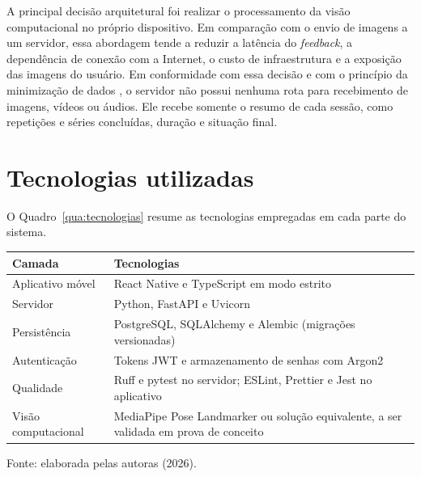 A principal decisão arquitetural foi realizar o processamento da visão computacional no próprio dispositivo. Em comparação com o envio de imagens a um servidor, essa abordagem tende a reduzir a latência do \textit{feedback}, a dependência de conexão com a Internet, o custo de infraestrutura e a exposição das imagens do usuário. Em conformidade com essa decisão e com o princípio da minimização de dados \cite{LGPD2018}, o servidor não possui nenhuma rota para recebimento de imagens, vídeos ou áudios. Ele recebe somente o resumo de cada sessão, como repetições e séries concluídas, duração e situação final.

\section{Tecnologias utilizadas}
\label{sec:tecnologias}

O Quadro~\ref{qua:tecnologias} resume as tecnologias empregadas em cada parte do sistema.

\begin{quadro}[htbp]
    \centering
    \caption{Tecnologias utilizadas no FisioMove}
    \label{qua:tecnologias}
    \begin{tabular}{|p{4cm}|p{10cm}|}
        \hline
        \textbf{Camada} & \textbf{Tecnologias} \\ \hline
        Aplicativo móvel & React Native e TypeScript em modo estrito \cite{ReactNative} \\ \hline
        Servidor & Python, FastAPI e Uvicorn \cite{FastAPI} \\ \hline
        Persistência & PostgreSQL, SQLAlchemy e Alembic (migrações versionadas) \\ \hline
        Autenticação & Tokens JWT e armazenamento de senhas com Argon2 \\ \hline
        Qualidade & Ruff e pytest no servidor; ESLint, Prettier e Jest no aplicativo \\ \hline
        Visão computacional & MediaPipe Pose Landmarker ou solução equivalente, a ser validada em prova de conceito \cite{GooglePose,Bazarevsky2020} \\ \hline
    \end{tabular}
    \par\medskip
    Fonte: elaborada pelas autoras (2026).
\end{quadro}


